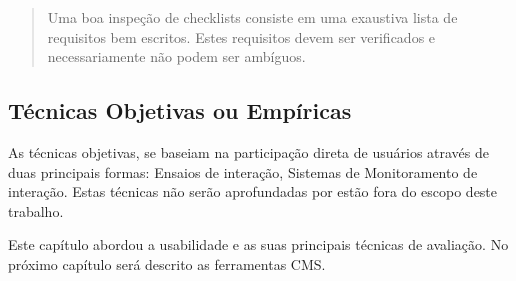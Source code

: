 \begin{quote}
Uma boa inspeção de checklists consiste em uma exaustiva lista de requisitos bem escritos. Estes requisitos devem ser verificados e necessariamente não podem ser ambíguos.
\cite{hci_design_usability}
\end{quote} 


\subsection{Técnicas Objetivas ou Empíricas}

As técnicas objetivas, se baseiam na participação direta de usuários através de duas principais formas: Ensaios de interação, Sistemas de Monitoramento de interação. Estas técnicas não serão aprofundadas por estão fora do escopo deste trabalho.

Este capítulo abordou a usabilidade e as suas principais técnicas de avaliação. No próximo capítulo será descrito as ferramentas CMS.



